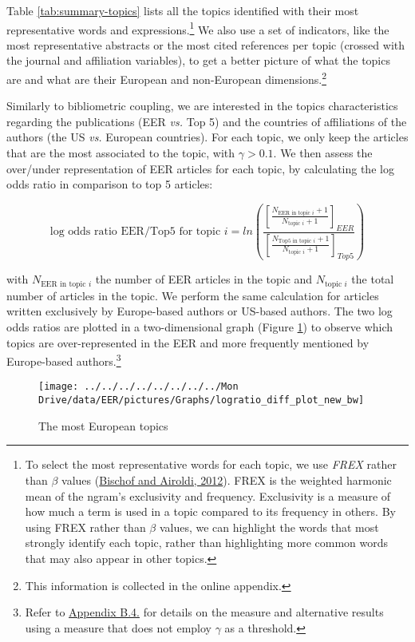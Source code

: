 \documentclass[
  12pt,
  onecolumn]{article}
\begin{document}
Table \ref{tab:summary-topics} lists all the topics identified with their most representative words and expressions.\footnote{To select the most representative words for each topic, we use \emph{FREX} rather than \(\beta\) values (\protect\hyperlink{ref-bischof2012}{Bischof and Airoldi, 2012}). FREX is the weighted harmonic mean of the ngram's exclusivity and frequency. Exclusivity is a measure of how much a term is used in a topic compared to its frequency in others. By using FREX rather than \(\beta\) values, we can highlight the words that most strongly identify each topic, rather than highlighting more common words that may also appear in other topics.} We also use a set of indicators, like the most representative abstracts or the most cited references per topic (crossed with the journal and affiliation variables), to get a better picture of what the topics are and what are their European and non-European dimensions.\footnote{This information is collected in the online appendix.}

Similarly to bibliometric coupling, we are interested in the topics characteristics regarding the publications (EER \emph{vs.} Top 5) and the countries of affiliations of the authors (the US \emph{vs.} European countries). For each topic, we only keep the articles that are the most associated to the topic, with \(\gamma > 0.1\). We then assess the over/under representation of EER articles for each topic, by calculating the log odds ratio in comparison to top 5 articles:

\[
\text{log odds ratio EER/Top5 for topic }i = ln(\frac{[\frac{N_{\text{EER in topic }i}+1}{N_{\text{topic }i} + 1}]_{EER}}{[\frac{N_{\text{Top5 in topic }i}+1}{N_{\text{topic }i} + 1}]_{Top5}})
\]

with \(N_{\text{EER in topic }i}\) the number of EER articles in the topic and \(N_{\text{topic }i}\) the total number of articles in the topic. We perform the same calculation for articles written exclusively by Europe-based authors or US-based authors. The two log odds ratios are plotted in a two-dimensional graph (Figure \ref{fig:plot-topic-diff}) to observe which topics are over-represented in the EER and more frequently mentioned by Europe-based authors.\footnote{Refer to \protect\hyperlink{topic}{Appendix B.4.} for details on the measure and alternative results using a measure that does not employ \(\gamma\) as a threshold.}

\begin{figure}[H]

{\centering \texttt{[image: ../../../../../../../../Mon Drive/data/EER/pictures/Graphs/logratio\_diff\_plot\_new\_bw]} 

}

\caption{The most European topics}\label{fig:plot-topic-diff}
\end{figure}
\end{document}
